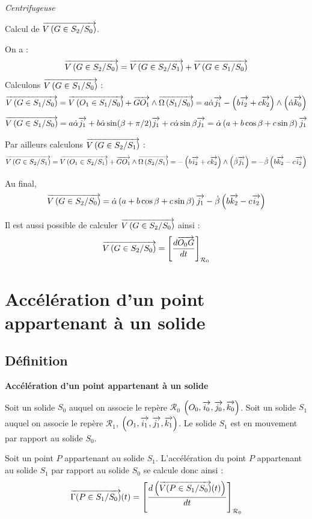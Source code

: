 \documentclass[10pt,oneside]{article}
\begin{document}
\begin{exemple}
\textit{Centrifugeuse}

Calcul de $\overrightarrow{V\left( {G} \in {S_2}/{S_0}\right)}$.

On a : 
$$\overrightarrow{V\left( {G} \in {S_2}/{S_0}\right)} = \overrightarrow{V\left( {G} \in {S_2}/{S_1}\right)} + \overrightarrow{V\left( {G} \in {S_1}/{S_0}\right)} $$
Calculons $\overrightarrow{V\left( {G} \in {S_1}/{S_0}\right)}$ :
$$
\overrightarrow{V\left( {G} \in {S_1}/{S_0}\right)} 
= \overrightarrow{V\left( {O_1} \in {S_1}/{S_0}\right)} + \overrightarrow{GO_1}\wedge\overrightarrow{\Omega\left( {S_1}/{S_0}\right)}
= a\dot{\alpha}\overrightarrow{j_1} - \left(b\overrightarrow{i_2} + c\overrightarrow{k_2}\right) \wedge\left( \dot{\alpha} \overrightarrow{k_0}\right)
$$
$$
\overrightarrow{V\left( {G} \in {S_1}/{S_0}\right)} 
= a\dot{\alpha}\overrightarrow{j_1}  + b\dot{\alpha} \sin(\beta+\pi/2) \overrightarrow{j_1} + c \dot{\alpha}\sin\beta\overrightarrow{j_1}
= \dot{\alpha} \left(a+b \cos\beta + c \sin\beta\right) \overrightarrow{j_1} 
$$

Par ailleurs calculons $\overrightarrow{V\left( {G} \in {S_2}/{S_1}\right)}$ :
$$\overrightarrow{V\left( {G} \in {S_2}/{S_1}\right)} = \overrightarrow{V\left( {O_1} \in {S_2}/{S_1}\right)} + \overrightarrow{GO_1}\wedge \overrightarrow{\Omega\left( {S_2}/{S_1}\right)}
=-\left(b\overrightarrow{i_2}+c\overrightarrow{k_2}\right) \wedge \left(\dot{\beta}\overrightarrow{j_1}\right)
=-\dot{\beta}\left(b\overrightarrow{k_2}-c\overrightarrow{i_2} \right)
$$

Au final, 
$$\overrightarrow{V\left( {G} \in {S_2}/{S_0}\right)} = \dot{\alpha} \left(a+b \cos\beta + c \sin\beta\right) \overrightarrow{j_1} 
-\dot{\beta}\left(b\overrightarrow{k_2}-c\overrightarrow{i_2} \right)
$$

Il est aussi possible de calculer $\overrightarrow{V\left( {G} \in {S_2}/{S_0}\right)}$ ainsi : 
$$\overrightarrow{V\left( {G} \in {S_2}/{S_0}\right)} = \left[\dfrac{d \overrightarrow{O_0G}}{dt}\right]_{\mathcal{R}_0}$$ 

\end{exemple}
\section{Accélération d'un point appartenant à un solide}
\subsection{Définition}
\begin{defi}
\textbf{Accélération d'un point appartenant à un solide}

Soit un solide $S_0$ auquel on associe le repère $\mathcal{R}_0$ $\left(O_0,\overrightarrow{i_0},\overrightarrow{j_0},\overrightarrow{k_0} \right)$.  Soit un solide $S_1$ auquel on associe le repère $\mathcal{R}_1$,  $\left(O_1,\overrightarrow{i_1},\overrightarrow{j_1},\overrightarrow{k_1} \right)$. Le solide $S_1$ est en mouvement par rapport au solide $S_0$. 


Soit un point $P$ appartenant au solide $S_1$. L'accélération du point $P$ appartenant au solide $S_1$ par rapport au solide $S_0$ se calcule donc ainsi : 
$$
\overrightarrow{\Gamma(P\in S_1/S_0)}(t) = \left[\dfrac{d\left( \overrightarrow{V(P\in S_1/S_0)}(t)\right)}{dt}\right]_{\mathcal{R}_0}
$$

\end{defi}
\end{document}
